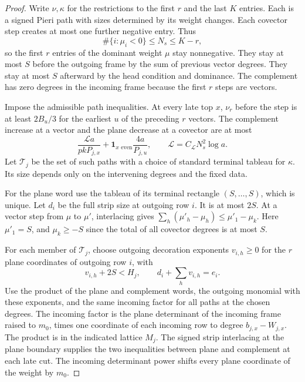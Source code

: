 \begin{proof}
Write \(\nu,\kappa\) for the restrictions to the
first \(r\) and the last \(K\) entries. Each is a signed Pieri
path with sizes determined by its weight changes. Each covector step creates at most one further negative entry. Thus
\[
 \#\{i:\mu_i<0\}\le N_s\le K-r,
\]
so the first \(r\) entries of the dominant weight \(\mu\) stay nonnegative. They stay at most \(S\) before the outgoing
frame by the sum of previous vector degrees. They stay at most
\(S\) afterward by the head condition and dominance. The
complement has zero degrees in the incoming frame because the
first \(r\) steps are vectors.

Impose the admissible path inequalities. At every
late top \(x\), \(\nu_r\) before the step is at least \(2B_u/3\)
for the earliest \(u\) of the preceding \(r\) vectors. The
complement increase at a vector and the plane decrease at a
covector are at most
\[
 \frac{\mathcal L a}{pkP_{j,x}}+
   \mathbf 1_{x\text{ even}}\frac{4a}{P_{j,u}},
 \qquad \mathcal L=C_{\mathcal L} N_s^2\log a.
\]
Let \(\mathcal T_j\) be the set of such paths with a choice of
standard terminal tableau for \(\kappa\). Its size depends only on
the intervening degrees and the fixed data.

For the plane word use
the tableau of its terminal rectangle \((S,\ldots,S)\), which is
unique. Let \(d_i\) be the full strip size at outgoing row \(i\).
It is at most \(2S\). At a vector step from \(\mu\) to \(\mu'\),
interlacing gives \(\sum_h(\mu'_h-\mu_h)\le\mu'_1-\mu_k\).
Here \(\mu'_1=S\), and \(\mu_k\ge-S\) since the total of all
covector degrees is at most \(S\).

For each member of \(\mathcal T_j\), choose outgoing decoration
exponents \(v_{i,h}\ge0\) for the \(r\) plane coordinates of
outgoing row \(i\), with
\begin{equation}\label{eq:plane-outgoing-decoration}
 v_{i,h}+2S<H_j,\qquad d_i+\sum_h v_{i,h}=e_i.
\end{equation}
Use the product of the plane and complement words, the outgoing
monomial with these exponents, and the same incoming factor for
all paths at the chosen degrees. The incoming factor is the
plane determinant of the incoming frame raised to \(m_0\), times
one coordinate of each incoming row to degree \(b_{j,x}-W_{j,x}\).
The product is in the indicated lattice \(M_j\). The signed strip
interlacing at the plane boundary supplies the two inequalities
between plane and complement at each late cut. The incoming determinant power shifts every plane coordinate of the weight by \(m_0\).


\end{proof}
